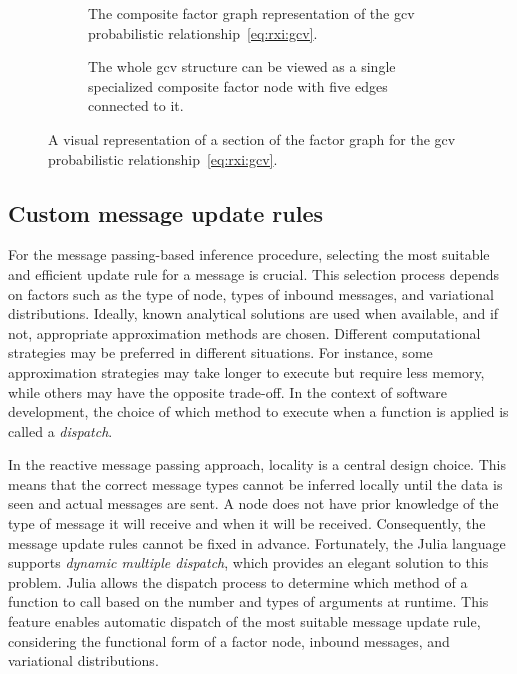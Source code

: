 \begin{figure}
  \centering
  \begin{subfigure}[t]{0.45\textwidth}
    \centering
    
    \caption{The composite factor graph representation of the \ac{gcv} probabilistic relationship~\eqref{eq:rxi:gcv}.
    }
    \label{fig:rxi:gcv_unfolded}
  \end{subfigure}
  \hfill
  \begin{subfigure}[t]{0.45\textwidth}
    \centering
    
    \caption{The whole \ac{gcv} structure can be viewed as a single specialized composite factor node with five edges connected to it.
    }
    \label{fig:rxi:gcv_folded}
  \end{subfigure}
  \caption{A visual representation of a section of the factor graph for the \ac{gcv} probabilistic relationship~\eqref{eq:rxi:gcv}.
  }
  \label{fig:rxi:gcv}
\end{figure}

\subsection{Custom message update rules}

For the message passing-based inference procedure, selecting the most suitable and efficient
update rule for a message is crucial.
This selection process depends on factors such as the type of node, types of inbound messages, and
variational distributions.
Ideally, known analytical solutions are used when available, and if not, appropriate
approximation methods are chosen.
Different computational strategies may be preferred in different situations.
For instance, some approximation strategies may take longer to execute but require less
memory, while others may have the opposite trade-off.
In the context of software development, the choice of which method to execute when a function
is applied is called a \textit{dispatch}.

In the reactive message passing approach, locality is a central design choice.
This means that the correct message types cannot be inferred locally until the data is seen
and actual messages are sent.
A node does not have prior knowledge of the type of message it will receive and when it will
be received.
Consequently, the message update rules cannot be fixed in advance.
Fortunately, the Julia language supports \textit{dynamic multiple dispatch}, which provides an
elegant solution to this problem.
Julia allows the dispatch process to determine which method of a function to call based on the
number and types of arguments at runtime.
This feature enables automatic dispatch of the most suitable message update rule, considering
the functional form of a factor node, inbound messages, and variational distributions.

